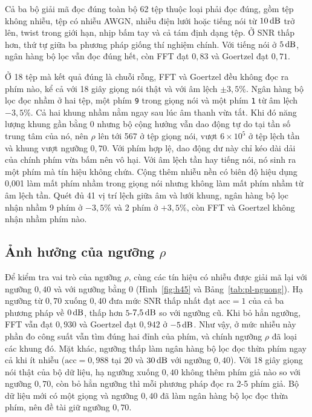 \documentclass{dtmf_report}
\begin{document}
Cả ba bộ giải mã đọc đúng toàn bộ 62 tệp thuộc loại phải đọc đúng, gồm tệp không
nhiễu, tệp có nhiễu AWGN, nhiễu điện lưới hoặc tiếng nói từ $10\,\mathrm{dB}$ trở lên, twist trong
giới hạn, nhịp bấm tay và cả tám định dạng tệp. Ở SNR thấp hơn, thứ tự giữa ba phương
pháp giống thí nghiệm chính. Với tiếng nói ở $5\,\mathrm{dB}$, ngân hàng bộ lọc vẫn đọc đúng hết, còn FFT
đạt $0{,}83$ và Goertzel đạt $0{,}71$.

Ở 18 tệp mà kết quả đúng là chuỗi rỗng, FFT và Goertzel đều không đọc ra phím nào, kể cả với 18 giây
giọng nói thật và với âm lệch $\pm 3{,}5\%$. Ngân hàng bộ lọc đọc nhầm ở hai tệp, một
phím \texttt{9} trong giọng nói và một phím \texttt{1} từ âm lệch $-3{,}5\%$. Cả hai
khung nhầm nằm ngay sau lúc âm thanh vừa tắt. Khi đó năng lượng khung gần bằng 0 nhưng
bộ cộng hưởng vẫn dao động tự do tại tần số trung tâm của nó, nên $\rho$ lên tới 567 ở
tệp giọng nói, vượt $6 \times 10^{5}$ ở tệp lệch tần và khung vượt ngưỡng $0{,}70$. Với
phím hợp lệ, dao động dư này chỉ kéo dài dải của chính phím vừa bấm nên vô hại. Với âm lệch
tần hay tiếng nói, nó sinh ra một phím mà tín hiệu không chứa. Cộng thêm nhiễu nền có biên
độ hiệu dụng 0,001 làm mất phím nhầm trong giọng nói nhưng không làm mất phím nhầm từ
âm lệch tần. Quét đủ 41 vị trí lệch giữa âm và lưới khung, ngân hàng bộ lọc nhận nhầm
9 phím ở $-3{,}5\%$ và 2 phím ở $+3{,}5\%$, còn FFT và Goertzel không nhận nhầm phím
nào.

\subsection{Ảnh hưởng của ngưỡng \texorpdfstring{$\rho$}{rho}}

Để kiểm tra vai trò của ngưỡng $\rho$, cùng các tín hiệu có nhiễu được giải mã lại
với ngưỡng $0{,}40$ và với ngưỡng bằng 0 (Hình~\ref{fig:h45} và
Bảng~\ref{tab:pl-nguong}). Hạ ngưỡng từ $0{,}70$ xuống $0{,}40$ đưa mức SNR thấp nhất
đạt $\mathrm{acc} = 1$ của cả ba phương pháp về $0\,\mathrm{dB}$, thấp hơn $5$-$7{,}5\,\mathrm{dB}$ so
với ngưỡng cũ. Khi bỏ hẳn ngưỡng, FFT vẫn đạt $0{,}930$ và Goertzel đạt $0{,}942$ ở
$-5\,\mathrm{dB}$. Như vậy, ở mức nhiễu này phần đo công suất vẫn tìm đúng hai đỉnh của phím,
và chính ngưỡng $\rho$ đã loại các khung đó. Mặt khác, ngưỡng thấp làm ngân hàng bộ
lọc đọc thừa phím ngay cả khi ít nhiễu ($\mathrm{acc} = 0{,}988$ tại $20$ và
$30\,\mathrm{dB}$ với ngưỡng $0{,}40$). Với 18 giây giọng nói thật của bộ dữ liệu, hạ ngưỡng
xuống $0{,}40$ không thêm phím giả nào so với ngưỡng $0{,}70$, còn bỏ hẳn ngưỡng thì
mỗi phương pháp đọc ra 2-5 phím giả. Bộ dữ liệu mới có một giọng và ngưỡng $0{,}40$ đã
làm ngân hàng bộ lọc đọc thừa phím, nên đề tài giữ ngưỡng $0{,}70$.
\end{document}
